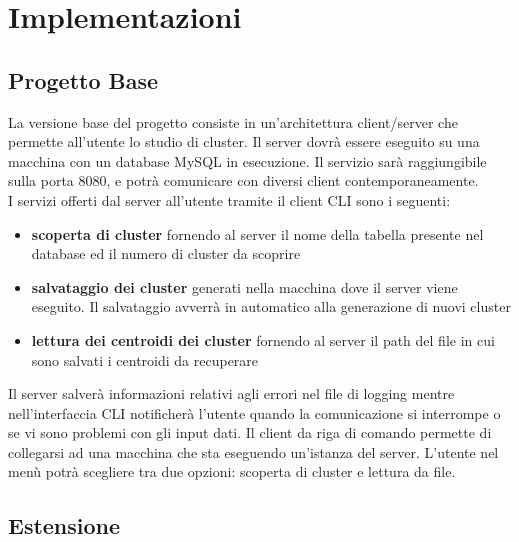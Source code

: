 \section{Implementazioni}
\subsection{Progetto Base}
\noindent La versione base del progetto consiste in un'architettura client/server che permette all'utente lo studio di cluster. Il server dovrà essere eseguito su una macchina con un database MySQL in esecuzione. 
Il servizio sarà raggiungibile sulla porta 8080, e potrà comunicare con diversi client contemporaneamente. 
\\ I servizi offerti dal server all'utente tramite il client CLI sono i seguenti:
\begin{itemize}[label=-]
  \item \textbf{scoperta di cluster} fornendo al server il nome della tabella presente nel database ed il numero di cluster da scoprire
  \item \textbf{salvataggio dei cluster} generati nella macchina dove il server viene eseguito. Il salvataggio avverrà in automatico alla generazione di nuovi cluster
  \item \textbf{lettura dei centroidi dei cluster} fornendo al server il path del file in cui sono salvati i centroidi da recuperare 
\end{itemize}
Il server salverà informazioni relativi agli errori nel file di logging mentre nell'interfaccia CLI notificherà l'utente quando la comunicazione si interrompe o se vi sono problemi con gli input dati. Il client da riga di comando permette di collegarsi ad una macchina che sta eseguendo un'istanza del server. L'utente nel menù potrà scegliere tra due opzioni: scoperta di cluster e lettura da file.

\subsection{Estensione}